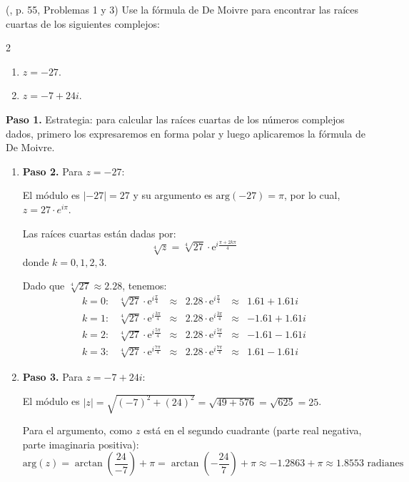 \begin{example} (\cite{andreescu2014complex}, p. 55, Problemas 1 y 3) Use la fórmula de De Moivre para encontrar las raíces cuartas de los siguientes complejos:
\begin{multicols}{2}
\begin{enumerate}[$a)$]
\item $z=-27$.
\item $z=-7+24i$.
\end{enumerate}
\end{multicols}
\begin{myproof}
\textbf{Paso 1.} Estrategia: para calcular las raíces cuartas de los números complejos dados, primero los expresaremos en forma polar y luego aplicaremos la fórmula de De Moivre.

\begin{enumerate}[$a)$]
\item \textbf{Paso 2.} Para $z=-27$:

   El módulo es $|-27| = 27$ y su argumento es $\text{arg}(-27) = \pi$, por lo cual, $z = 27\cdot e^{i\pi}$.

   Las raíces cuartas están dadas por:
   $$\boxed{\sqrt[4]{z} = \sqrt[4]{27}\cdot \mathrm{e}^{i\frac{\pi+2k\pi}{4}}}$$
   donde $k=0,1,2,3$.

   Dado que $\sqrt[4]{27} \approx 2.28$, tenemos:
   $$\begin{matrix}
   k=0: & \sqrt[4]{27}\cdot\mathrm{e}^{i\frac{\pi}{4}} &\approx& 2.28\cdot\mathrm{e}^{i\frac{\pi}{4}} &\approx& 1.61+1.61i \\
   k=1: & \sqrt[4]{27}\cdot\mathrm{e}^{i\frac{3\pi}{4}} &\approx& 2.28\cdot\mathrm{e}^{i\frac{3\pi}{4}} &\approx& -1.61+1.61i \\
   k=2: & \sqrt[4]{27}\cdot\mathrm{e}^{i\frac{5\pi}{4}} &\approx& 2.28\cdot\mathrm{e}^{i\frac{5\pi}{4}} &\approx& -1.61-1.61i \\
   k=3: & \sqrt[4]{27}\cdot\mathrm{e}^{i\frac{7\pi}{4}} &\approx& 2.28\cdot\mathrm{e}^{i\frac{7\pi}{4}} &\approx& 1.61-1.61i
   \end{matrix}$$

\item \textbf{Paso 3.} Para $z=-7+24i$:

   El módulo es $|z| = \sqrt{(-7)^2+(24)^2} = \sqrt{49+576} = \sqrt{625} = 25$.

   Para el argumento, como $z$ está en el segundo cuadrante (parte real negativa, parte imaginaria positiva):
   $$\text{arg}(z) = \arctan\left(\frac{24}{-7}\right) + \pi = \arctan(-\frac{24}{7}) + \pi \approx -1.2863 + \pi \approx 1.8553 \text{ radianes}$$


\end{enumerate}
\end{myproof}
\end{example}
